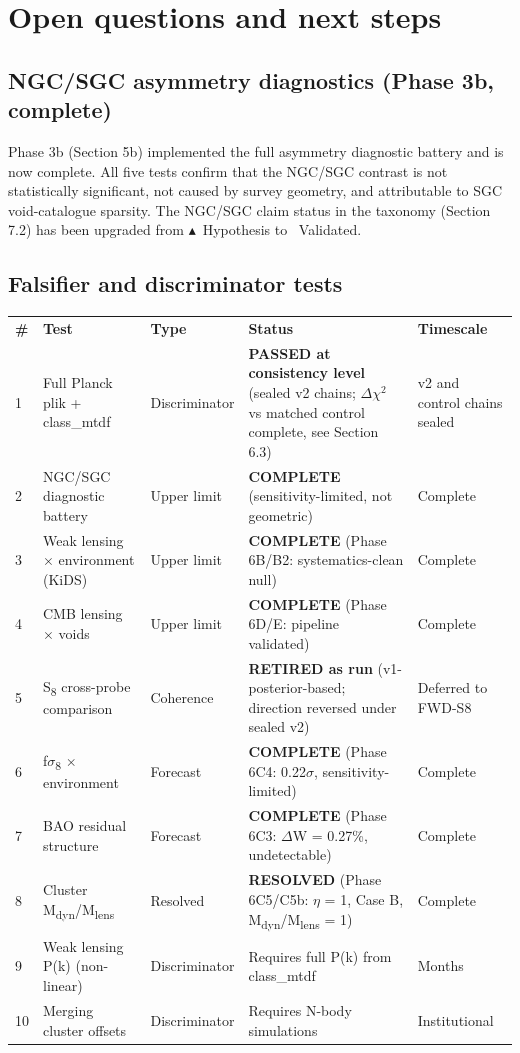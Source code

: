 \documentclass[11pt,a4paper]{article}
\begin{document}
\section{Open questions and next steps}
\label{sec:sec8}

\subsection{NGC/\allowbreak{}SGC asymmetry diagnostics (Phase 3b, complete)}
Phase 3b (Section 5b) implemented the full asymmetry diagnostic battery and is now complete. All five tests confirm that the NGC/\allowbreak{}SGC contrast is not statistically significant, not caused by survey geometry, and attributable to SGC void-catalogue sparsity. The NGC/\allowbreak{}SGC claim status in the taxonomy (Section 7.2) has been upgraded from $\blacktriangle$~Hypothesis to \checkmark{}~Validated.

\subsection{Falsifier and discriminator tests}
\begin{table}[H]
\centering
\footnotesize
\begin{tabularx}{\linewidth}{l>{\RaggedRight\arraybackslash}X>{\RaggedRight\arraybackslash}X>{\RaggedRight\arraybackslash}X>{\RaggedRight\arraybackslash}X}
\toprule
\textbf{\#} & \textbf{Test} & \textbf{Type} & \textbf{Status} & \textbf{Timescale} \tabularnewline
1 & Full Planck plik + class\_\allowbreak{}mtdf & Discriminator & \textbf{PASSED at consistency level} (sealed v2 chains; $\Delta$$\chi$$^{2}$ vs matched control complete, see Section 6.3) & v2 and control chains sealed \tabularnewline
2 & NGC/\allowbreak{}SGC diagnostic battery & Upper limit & \textbf{COMPLETE} (sensitivity-limited, not geometric) & Complete \tabularnewline
3 & Weak lensing $\times$ environment (KiDS) & Upper limit & \textbf{COMPLETE} (Phase 6B/\allowbreak{}B2: systematics-clean null) & Complete \tabularnewline
4 & CMB lensing $\times$ voids & Upper limit & \textbf{COMPLETE} (Phase 6D/\allowbreak{}E: pipeline validated) & Complete \tabularnewline
5 & S\textsubscript{8} cross-probe comparison & Coherence & \textbf{RETIRED as run} (v1-posterior-based; direction reversed under sealed v2) & Deferred to FWD-S8 \tabularnewline
6 & f$\sigma$\textsubscript{8} $\times$ environment & Forecast & \textbf{COMPLETE} (Phase 6C4: 0.22$\sigma$, sensitivity-limited) & Complete \tabularnewline
7 & BAO residual structure & Forecast & \textbf{COMPLETE} (Phase 6C3: $\Delta$W = 0.27\%, undetectable) & Complete \tabularnewline
8 & Cluster M\textsubscript{dyn}/M\textsubscript{lens} & Resolved & \textbf{RESOLVED} (Phase 6C5/\allowbreak{}C5b: $\eta$ = 1, Case B, M\textsubscript{dyn}/M\textsubscript{lens} = 1) & Complete \tabularnewline
9 & Weak lensing P(k) (non-linear) & Discriminator & Requires full P(k) from class\_\allowbreak{}mtdf & Months \tabularnewline
10 & Merging cluster offsets & Discriminator & Requires N-body simulations & Institutional \tabularnewline
\bottomrule
\end{tabularx}
\end{table}
\end{document}
